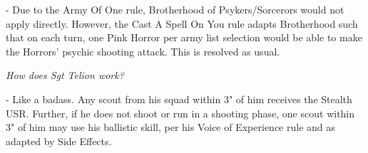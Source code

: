 \begin{multicols}{2}
- Due to the Army Of One rule, Brotherhood of Psykers/Sorcerors would
  not apply directly.  However, the Cast A Spell On You rule adapts
  Brotherhood such that on each turn, one Pink Horror per army list
  selection would be able to make the Horrors' psychic shooting
  attack.  This is resolved as usual.


\bigskip{}%

\smallskip\noindent\emph{How does Sgt Telion work?}

- Like a badass.  Any scout from his squad within 3" of him receives
  the Stealth USR.  Further, if he does not shoot or run in a shooting
  phase, one scout within 3" of him may use his ballistic skill, per
  his Voice of Experience rule and as adapted by Side Effects.

\end{multicols}

